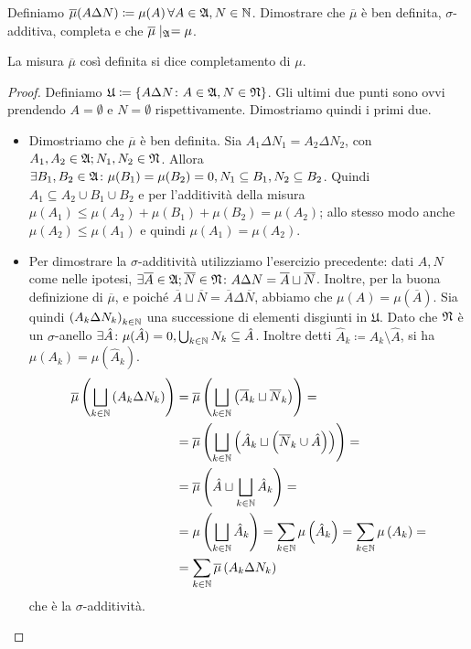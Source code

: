 \documentclass[../EserciziIstituzioniAnalisi.tex]{subfiles}
\begin{document}
\begin{exercise}[2016-10-27]
  Definiamo $\overline \mu(A \Delta N) \coloneqq \mu (A) \,\forall A \in \mathfrak A,N\in\mathbb N$.
  Dimostrare che $\overline \mu$ è ben definita, $\sigma$-additiva, completa e che $\overline \mu\mid_{\mathfrak A}=\mu$.
\end{exercise}
\begin{remark}
  La misura $\overline\mu$ così definita si dice completamento di $\mu$.
\end{remark}
\begin{proof}
  Definiamo $\mathfrak{U}\coloneqq \left\{A\Delta N\colon A\in\mathfrak A,N\in\mathfrak N\right\}$. Gli ultimi due punti sono ovvi prendendo $A=\emptyset$ e $N=\emptyset$ rispettivamente. Dimostriamo quindi i primi due.
  \begin{itemize}
    \item Dimostriamo che $\overline\mu$ è ben definita. Sia $A_1 \Delta N_1=A_2\Delta N_2$, con $A_1,A_2\in \mathfrak A; N_1,N_2\in\mathfrak N$. Allora $\exists B_1, B_2\in \mathfrak A\colon \mu(B_1)=\mu(B_2)=0, N_1\subseteq B_1, N_2\subseteq B_2$. Quindi $A_1\subseteq A_2\cup B_1 \cup B_2$ e per l'additività della misura $\mu(A_1)\leq \mu(A_2)+\mu(B_1)+\mu(B_2)=\mu(A_2)$; allo stesso modo anche $\mu(A_2)\leq \mu(A_1)$ e quindi $\mu(A_1)=\mu(A_2)$.
    \item Per dimostrare la $\sigma$-additività utilizziamo l'esercizio precedente: dati $A,N$ come nelle ipotesi, $\exists \overline A\in \mathfrak A; \overline N\in\mathfrak N \colon A \Delta N= \overline A \sqcup \overline N$. Inoltre, per la buona definizione di $\overline \mu$, e poiché $\overline A \sqcup \overline N=\overline A \Delta \overline N$, abbiamo che $\mu(A)=\mu(\overline A)$. Sia quindi $\left(A_k \Delta N_k \right)_{k\in \mathbb N}$ una successione di elementi disgiunti in $\mathfrak{U}$. Dato che $\mathfrak N$ è un $\sigma$-anello $\exists \hat A\colon \mu(\hat A)=0, \bigcup_{k \in \mathbb N} N_k\subseteq \hat A$. Inoltre detti $\hat A_k\coloneqq A_k \setminus \hat A$, si ha $\mu(A_k)=\mu(\hat A_k)$.
    \begin{equation*}
      \begin{aligned}
        \overline \mu\left(\bigsqcup_{k\in \mathbb N} \left( A_k \Delta N_k\right)\right)&=\overline \mu\left(\bigsqcup_{k\in \mathbb N} \left(\overline A_k \sqcup \overline N_k\right)\right)=\\
        &=\overline \mu\left(\bigsqcup_{k\in \mathbb N} \left(\hat A_k \sqcup \left(\overline N_k \cup\hat A \right)\right)\right)=\\
        &=\overline \mu\left(\hat A \sqcup \bigsqcup_{k\in \mathbb N} \hat A_k \right)=\\
        &=\mu\left(\bigsqcup_{k\in \mathbb N} \hat A_k\right)=\sum_{k \in \mathbb N}\mu\left(\hat A_k\right)=\sum_{k \in \mathbb N}\mu\left(A_k\right)=\\
        &=\sum_{k \in \mathbb N}\overline\mu\left(A_k \Delta N_k\right)
      \end{aligned}
    \end{equation*}
    che è la $\sigma$-additività.
  \end{itemize}
\end{proof}
\end{document}
